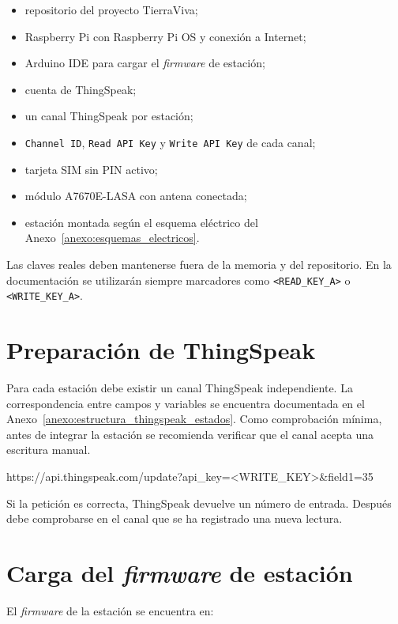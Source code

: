 \begin{itemize}
    \item repositorio del proyecto TierraViva;
    \item Raspberry Pi con Raspberry Pi OS y conexión a Internet;
    \item Arduino IDE para cargar el \textit{firmware} de estación;
    \item cuenta de ThingSpeak;
    \item un canal ThingSpeak por estación;
    \item \texttt{Channel ID}, \texttt{Read API Key} y \texttt{Write API Key} de cada canal;
    \item tarjeta SIM sin PIN activo;
    \item módulo A7670E-LASA con antena conectada;
    \item estación montada según el esquema eléctrico del Anexo~\ref{anexo:esquemas_electricos}.
\end{itemize}

Las claves reales deben mantenerse fuera de la memoria y del repositorio. En la documentación se utilizarán siempre marcadores como \texttt{<READ\_KEY\_A>} o \texttt{<WRITE\_KEY\_A>}.

\section{Preparación de ThingSpeak}

Para cada estación debe existir un canal ThingSpeak independiente. La correspondencia entre campos y variables se encuentra documentada en el Anexo~\ref{anexo:estructura_thingspeak_estados}. Como comprobación mínima, antes de integrar la estación se recomienda verificar que el canal acepta una escritura manual.

\begin{terminaloutput}
https://api.thingspeak.com/update?api_key=<WRITE_KEY>&field1=35
\end{terminaloutput}

Si la petición es correcta, ThingSpeak devuelve un número de entrada. Después debe comprobarse en el canal que se ha registrado una nueva lectura.

\section{Carga del \textit{firmware} de estación}

El \textit{firmware} de la estación se encuentra en:

